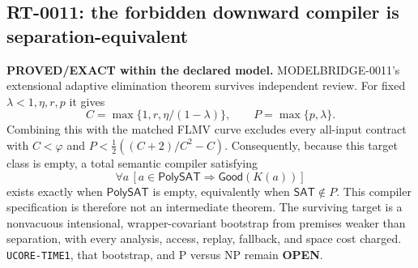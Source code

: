 \subsection*{RT-0011: the forbidden downward compiler is separation-equivalent}
\textbf{PROVED/EXACT within the declared model.}
MODELBRIDGE-0011's extensional adaptive elimination theorem survives
independent review.  For fixed $\lambda<1,\eta,r,p$ it gives
\[
 C=\max\{1,r,\eta/(1-\lambda)\},\qquad P=\max\{p,\lambda\}.
\]
Combining this with the matched FLMV curve excludes every all-input contract
with $C<\varphi$ and
$P<\frac12((C+2)/C^2-C)$.  Consequently, because this target class is empty,
a total semantic compiler satisfying
\[
 \forall a\,[a\in\mathsf{PolySAT}\Rightarrow
 \mathsf{Good}(K(a))]
\]
exists exactly when $\mathsf{PolySAT}$ is empty, equivalently when
$\mathsf{SAT}\notin P$.  This compiler specification is therefore not an
intermediate theorem.  The surviving target is a nonvacuous intensional,
wrapper-covariant bootstrap from premises weaker than separation, with every
analysis, access, replay, fallback, and space cost charged.
\texttt{UCORE-TIME1}, that bootstrap, and P versus NP remain \textbf{OPEN}.

